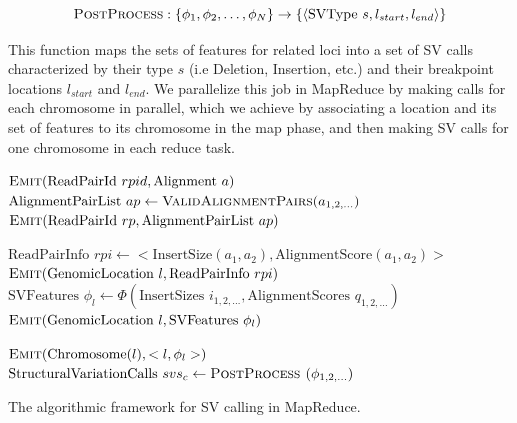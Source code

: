  \[ \textsc{PostProcess} : \left\{\phi_1,\phi_2,\ldots,\phi_N\right\} \rightarrow \left\{\langle  \textrm{SVType } s, l_{start}, l_{end} \rangle\right\} \]

This function maps the sets of features for related loci into a set of SV calls characterized by their type $s$ (i.e Deletion, Insertion, etc.) and their breakpoint locations $l_{start}$ and $l_{end}$. We parallelize this job in MapReduce by making calls for each chromosome in parallel, which we achieve by associating a location and its set of features to its chromosome in the map phase, and then making SV calls for one chromosome in each reduce task.

\begin{algorithm}[t]
\algrenewcommand{}
 \begin{algorithmic}[1]
 \State $\textsc{Emit}(\textrm{ReadPairId }rpid, \textrm{Alignment }a)$
 \EndFor
 \EndFunction
 \State $\textrm{AlignmentPairList }ap \gets \textsc{ValidAlignmentPairs}(a_{1,2,\ldots})$
 \State $\textsc{Emit}(\textrm{ReadPairId }rp, \textrm{AlignmentPairList } ap)$
 \EndFunction
 \EndProcedure

 \State $ \textrm{ReadPairInfo }rpi \gets <\textrm{InsertSize}(a_1,a_2), \textrm{AlignmentScore}(a_1,a_2)>$
 \State $\textsc{Emit}(\textrm{GenomicLocation }l, \textrm{ReadPairInfo }rpi)$
 \EndFor
 \EndFor
 \EndFunction
 \State $\textrm{SVFeatures } \phi_l \gets \Phi(\textrm{InsertSizes }i_{1,2,\ldots}, \textrm{AlignmentScores }q_{1,2,\ldots})$
 \State $\textsc{Emit}(\textrm{GenomicLocation }l, \textrm{SVFeatures } \phi_l)$
 \EndFunction
 \EndProcedure

 \State $\textsc{Emit}(\textrm{Chromosome}(l), <l,\phi_l>)$
 \EndFunction
 \State $\textrm{StructuralVariationCalls } svs_c \gets \textsc{PostProcess }(\phi_{1,2,\ldots})$
 \EndFunction
 \EndProcedure
 \end{algorithmic}
\caption{The algorithmic framework for SV calling in MapReduce.}
\label{cb_algo}
\end{algorithm}

